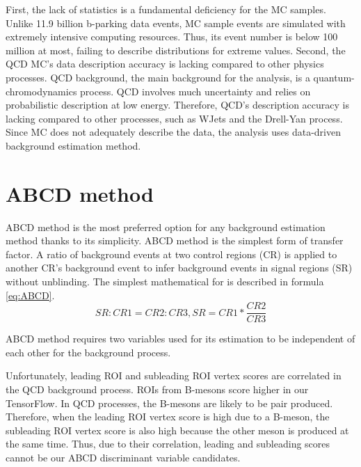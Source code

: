 First, the lack of statistics is a fundamental deficiency for the MC samples.
Unlike 11.9 billion b-parking data events, MC sample events are simulated with extremely intensive computing resources.
Thus, its event number is below 100 million at most, failing to describe distributions for extreme values.
Second, the QCD MC's data description accuracy is lacking compared to other physics processes.
QCD background, the main background for the analysis, is a quantum-chromodynamics process.
QCD involves much uncertainty and relies on probabilistic description at low energy.
Therefore, QCD's description accuracy is lacking compared to other processes, such as WJets and the Drell-Yan process.
Since MC does not adequately describe the data, the analysis uses data-driven background estimation method.




\section{ABCD method}
ABCD method is the most preferred option for any background estimation method thanks to its simplicity.
ABCD method is the simplest form of transfer factor.
A ratio of background events at two control regions (CR) is applied to another CR's background event to infer background events in signal regions (SR) without unblinding.
The simplest mathematical for is described in formula \ref{eq:ABCD}.
\begin{equation}
\label{eq:ABCD}
	SR:CR1=CR2:CR3, SR=CR1*\frac{CR2}{CR3} 
\end{equation}

ABCD method requires two variables used for its estimation to be independent of each other for the background process.


Unfortunately, leading ROI and subleading ROI vertex scores are correlated in the QCD background process.
ROIs from B-mesons score higher in our TensorFlow.
In QCD processes, the B-mesons are likely to be pair produced.
Therefore, when the leading ROI vertex score is high due to a B-meson, the subleading ROI vertex score is also high because the other meson is produced at the same time.
Thus, due to their correlation, leading and subleading scores cannot be our ABCD discriminant variable candidates.

